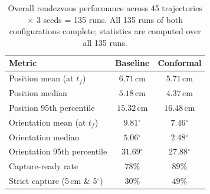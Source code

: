 \begin{table}[t]
\centering
\caption{Overall rendezvous performance across 45 trajectories $\times$ 3 seeds = 135 runs. All 135 runs of both configurations complete; statistics are computed over all 135 runs.}
\label{tab:overall}
\begin{tabular}{lcc}
\toprule
\textbf{Metric} & \textbf{Baseline} & \textbf{Conformal} \\
\midrule
Position mean (at $t_f$) & $6.71$\,cm & $5.71$\,cm \\
Position median & $5.18$\,cm & $4.37$\,cm \\
Position 95th percentile & $15.32$\,cm & $16.48$\,cm \\
Orientation mean (at $t_f$) & $9.81$$^{\circ}$ & $7.46$$^{\circ}$ \\
Orientation median & $5.06$$^{\circ}$ & $2.48$$^{\circ}$ \\
Orientation 95th percentile & $31.69$$^{\circ}$ & $27.88$$^{\circ}$ \\
\midrule
Capture-ready rate & $78\%$ & $89\%$ \\
Strict capture (5\,cm \& 5$^{\circ}$) & $30\%$ & $49\%$ \\
\bottomrule
\end{tabular}
\end{table}